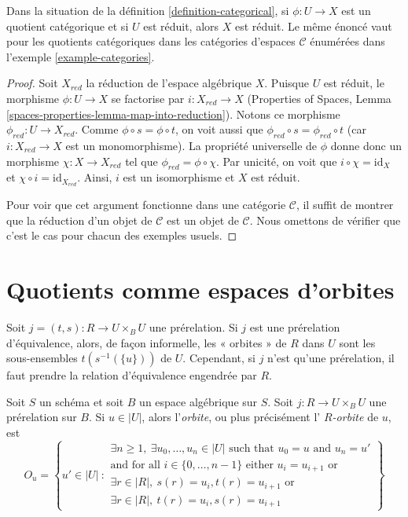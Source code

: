 \begin{lemma}
\label{lemma-categorical-reduced}
Dans la situation de la
définition \ref{definition-categorical},
si $\phi : U \to X$ est un quotient catégorique et si $U$ est réduit,
alors $X$ est réduit. Le même énoncé vaut pour les quotients catégoriques dans
les catégories d'espaces $\mathcal{C}$ énumérées dans
l'exemple \ref{example-categories}.
\end{lemma}

\begin{proof}
Soit $X_{red}$ la réduction de l'espace algébrique $X$.
Puisque $U$ est réduit, le morphisme $\phi : U \to X$ se factorise par
$i : X_{red} \to X$ (Properties of Spaces, Lemma
\ref{spaces-properties-lemma-map-into-reduction}). Notons ce morphisme
$\phi_{red} : U \to X_{red}$. Comme $\phi \circ s = \phi \circ t$, on
voit aussi que $\phi_{red} \circ s = \phi_{red} \circ t$ (car
$i : X_{red} \to X$ est un monomorphisme). La propriété universelle
de $\phi$ donne donc un morphisme $\chi : X \to X_{red}$ tel que
$\phi_{red} = \phi \circ \chi$. Par unicité, on voit que
$i \circ \chi = \text{id}_X$ et $\chi \circ i = \text{id}_{X_{red}}$.
Ainsi, $i$ est un isomorphisme et $X$ est réduit.

\medskip\noindent
Pour voir que cet argument fonctionne dans une catégorie $\mathcal{C}$, il
suffit de montrer que la réduction d'un objet de $\mathcal{C}$
est un objet de $\mathcal{C}$. Nous omettons de vérifier que c'est
le cas pour chacun des exemples usuels.
\end{proof}





\section{Quotients comme espaces d'orbites}
\label{section-orbits}

\noindent
Soit $j = (t, s) : R \to U \times_B U$ une prérelation.
Si $j$ est une prérelation d'équivalence, alors, de façon informelle,
les « orbites » de $R$ dans $U$
sont les sous-ensembles $t(s^{-1}(\{u\}))$ de $U$. Cependant, si $j$ n'est qu'une
prérelation, il faut prendre la relation d'équivalence engendrée
par $R$.

\begin{definition}
\label{definition-orbit}
Soit $S$ un schéma et soit $B$ un espace algébrique sur $S$.
Soit $j : R \to U \times_B U$ une prérelation sur $B$.
Si $u \in |U|$, alors l'{\it orbite}, ou plus précisément l'
{\it $R$-orbite} de $u$, est
$$
O_u =
\left\{
u' \in |U|\ :
\begin{matrix}
\exists n \geq 1, \ \exists u_0, \ldots, u_n \in |U|\text{ such that }
u_0 = u \text{ and } u_n = u' \\
\text{and for all }i \in \{0, \ldots, n - 1\}\text{ either }
u_i = u_{i + 1}\text{ or } \\
\exists r \in |R|, \ s(r) = u_i, t(r) = u_{i + 1}
\text{ or } \\
\exists r \in |R|, \ t(r) = u_i, s(r) = u_{i + 1}
\end{matrix}
\right\}
$$
\end{definition}

